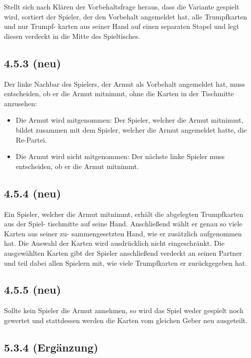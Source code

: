 Stellt sich nach Klären der Vorbehaltsfrage heraus, dass die Variante
 gespielt wird, sortiert der Spieler, der den Vorbehalt
angemeldet hat, alle Trumpfkarten und nur Trumpf- karten aus seiner Hand
auf einen separaten Stapel und legt diesen verdeckt in die Mitte des
Spieltisches.

\subsection*{4.5.3 (neu)}

Der linke Nachbar des Spielers, der Armut als Vorbehalt angemeldet hat,
muss entscheiden, ob er die Armut mitnimmt, ohne die Karten in der
Tischmitte anzusehen:

\begin{itemize}
	\item Die Armut wird mitgenommen: Der Spieler, welcher die Armut
		mitnimmt, bildet zusammen mit dem Spieler, welcher die Armut
		angemeldet hatte, die Re-Partei.
	\item Die Armut wird nicht mitgenommen: Der nächste linke Spieler
		muss entscheiden, ob er die Armut mitnimmt.
\end{itemize}

\subsection*{4.5.4 (neu)}

Ein Spieler, welcher die Armut mitnimmt, erhält die abgelegten
Trumpfkarten aus der Spiel- tischmitte auf seine Hand. Anschließend
wählt er genau so viele Karten aus seiner zu- sammengesetzten Hand, wie
er zusätzlich aufgenommen hat. Die Auswahl der Karten wird
ausdrücklich nicht eingeschränkt. Die ausgewählten Karten gibt der
Spieler anschließend verdeckt an seinen Partner und teil dabei allen
Spielern mit, wie viele Trumpfkarten er zurückgegeben hat.

\subsection*{4.5.5 (neu)}

Sollte kein Spieler die Armut annehmen, so wird das Spiel weder gespielt
noch gewertet und stattdessen werden die Karten vom gleichen Geber neu
ausgeteilt.

\subsection*{5.3.4 (Ergänzung)}

